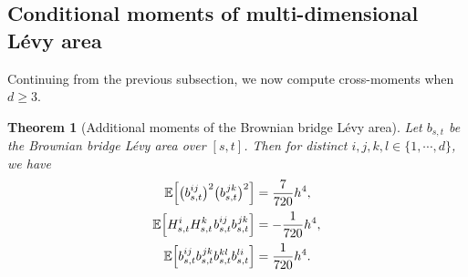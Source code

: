 \documentclass[sn-mathphys-num]{sn-jnl}%
\newtheorem{theorem}{Theorem}%
\newcommand{\E}{\mathbb{E}}
\newcommand{\m}{\hspace{0.25mm}}
\begin{document}
\subsection{Conditional moments of multi-dimensional L\'{e}vy area}\label{sect:moments2}

Continuing from the previous subsection, we now compute cross-moments when $d\geq 3$.\medbreak
\begin{theorem}[Additional moments of the Brownian bridge L\'{e}vy area]\label{thm:levy_area_moments2}
Let $b_{s,t}$ be the Brownian bridge L\'{e}vy area over $[s,t]$. Then for distinct $i,j,k,l\in\{1,\cdots, d\}$, we have
\begin{align}
\E\Big[\big(b_{s,t}^{ij}\big)^2\big(b_{s,t}^{\m jk}\big)^2\Big] & = \frac{7}{720}h^4,\label{eq:cross_moment1}\\[1pt]
\E\Big[H_{s,t}^i H_{s,t}^k\m b_{s,t}^{ij}b_{s,t}^{\m jk}\Big] & = -\frac{1}{720}h^4,\label{eq:cross_moment2}\\[1pt]
\E\Big[b_{s,t}^{ij}b_{s,t}^{\m jk}b_{s,t}^{kl}b_{s,t}^{li}\Big] & = \frac{1}{720}h^4.\label{eq:cross_moment3}
\end{align}
\end{theorem}
\end{document}
